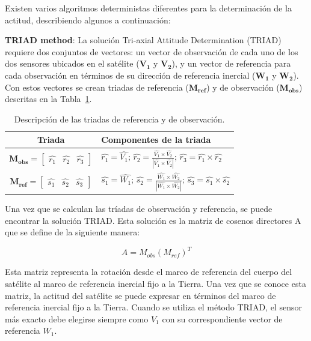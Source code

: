 Existen varios algoritmos deterministas diferentes para la determinación de la actitud, describiendo algunos a continuación:

\textbf{TRIAD method}: La solución Tri-axial Attitude Determination (TRIAD) requiere dos conjuntos de vectores: un vector de observación de cada uno de los dos sensores ubicados en el satélite ($\mathbf{V_1}$ y $\mathbf{V_2}$), y un vector de referencia para cada observación en términos de su dirección de referencia inercial ($\mathbf{W_1}$ y $\mathbf{W_2}$). Con estos vectores se crean triadas de referencia ($\mathbf{M_{ref}}$) y de observación ($\mathbf{M_{obs}}$) descritas en la Tabla~\ref{tab:triad}.

\begin{table}[h!]
	\centering
	\caption{Descripción de las triadas de referencia y de observación.}
	\begin{tabular}{|c|p{10cm}|}
		\hline
		\textbf{Triada} & \textbf{Componentes de la triada} \\ \hline
		$\mathbf{M_{obs}} = \begin{bmatrix} \hat{r_1} & \hat{r_2} & \hat{r_3} \end{bmatrix}$ & $\hat{r_1} = \hat{V_1}; \, \hat{r_2} = \frac{\hat{V_1} \times \hat{V_2}}{|\hat{V_1} \times \hat{V_2}|}; \, \hat{r_3} = \hat{r_1} \times \hat{r_2}$ \\ \hline
		$\mathbf{M_{ref}} = \begin{bmatrix} \hat{s_1} & \hat{s_2} & \hat{s_3} \end{bmatrix}$ & $\hat{s_1} = \hat{W_1}; \, \hat{s_2} = \frac{\hat{W_1} \times \hat{W_2}}{|\hat{W_1} \times \hat{W_2}|}; \, \hat{s_3} = \hat{s_1} \times \hat{s_2}$ \\ \hline
	\end{tabular}
	\label{tab:triad}
\end{table}

Una vez que se calculan las tríadas de observación y referencia, se puede encontrar la solución TRIAD. Esta solución es la matriz de cosenos directores A que se define de la siguiente manera:

\[
A = M_{obs} (M_{ref})^T
\]

Esta matriz representa la rotación desde el marco de referencia del cuerpo del satélite al marco de referencia inercial fijo a la Tierra. Una vez que se conoce esta matriz, la actitud del satélite se puede expresar en términos del marco de referencia inercial fijo a la Tierra. Cuando se utiliza el método TRIAD, el sensor más exacto debe elegirse siempre como $V_1$ con su correspondiente vector de referencia $W_1$.

